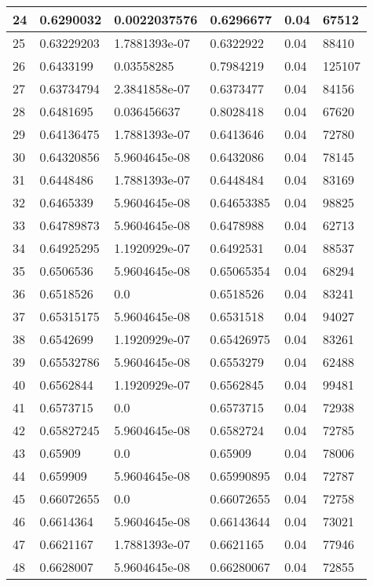 \begin{longtable}{|l|l|l|l|l|l|}
24 & 0.6290032 & 0.0022037576 & 0.6296677 & 0.04 & 67512 \\ \hline 
25 & 0.63229203 & 1.7881393e-07 & 0.6322922 & 0.04 & 88410 \\ \hline 
26 & 0.6433199 & 0.03558285 & 0.7984219 & 0.04 & 125107 \\ \hline 
27 & 0.63734794 & 2.3841858e-07 & 0.6373477 & 0.04 & 84156 \\ \hline 
28 & 0.6481695 & 0.036456637 & 0.8028418 & 0.04 & 67620 \\ \hline 
29 & 0.64136475 & 1.7881393e-07 & 0.6413646 & 0.04 & 72780 \\ \hline 
30 & 0.64320856 & 5.9604645e-08 & 0.6432086 & 0.04 & 78145 \\ \hline 
31 & 0.6448486 & 1.7881393e-07 & 0.6448484 & 0.04 & 83169 \\ \hline 
32 & 0.6465339 & 5.9604645e-08 & 0.64653385 & 0.04 & 98825 \\ \hline 
33 & 0.64789873 & 5.9604645e-08 & 0.6478988 & 0.04 & 62713 \\ \hline 
34 & 0.64925295 & 1.1920929e-07 & 0.6492531 & 0.04 & 88537 \\ \hline 
35 & 0.6506536 & 5.9604645e-08 & 0.65065354 & 0.04 & 68294 \\ \hline 
36 & 0.6518526 & 0.0 & 0.6518526 & 0.04 & 83241 \\ \hline 
37 & 0.65315175 & 5.9604645e-08 & 0.6531518 & 0.04 & 94027 \\ \hline 
38 & 0.6542699 & 1.1920929e-07 & 0.65426975 & 0.04 & 83261 \\ \hline 
39 & 0.65532786 & 5.9604645e-08 & 0.6553279 & 0.04 & 62488 \\ \hline 
40 & 0.6562844 & 1.1920929e-07 & 0.6562845 & 0.04 & 99481 \\ \hline 
41 & 0.6573715 & 0.0 & 0.6573715 & 0.04 & 72938 \\ \hline 
42 & 0.65827245 & 5.9604645e-08 & 0.6582724 & 0.04 & 72785 \\ \hline 
43 & 0.65909 & 0.0 & 0.65909 & 0.04 & 78006 \\ \hline 
44 & 0.659909 & 5.9604645e-08 & 0.65990895 & 0.04 & 72787 \\ \hline 
45 & 0.66072655 & 0.0 & 0.66072655 & 0.04 & 72758 \\ \hline 
46 & 0.6614364 & 5.9604645e-08 & 0.66143644 & 0.04 & 73021 \\ \hline 
47 & 0.6621167 & 1.7881393e-07 & 0.6621165 & 0.04 & 77946 \\ \hline 
48 & 0.6628007 & 5.9604645e-08 & 0.66280067 & 0.04 & 72855 \\ \hline 

\end{longtable}
